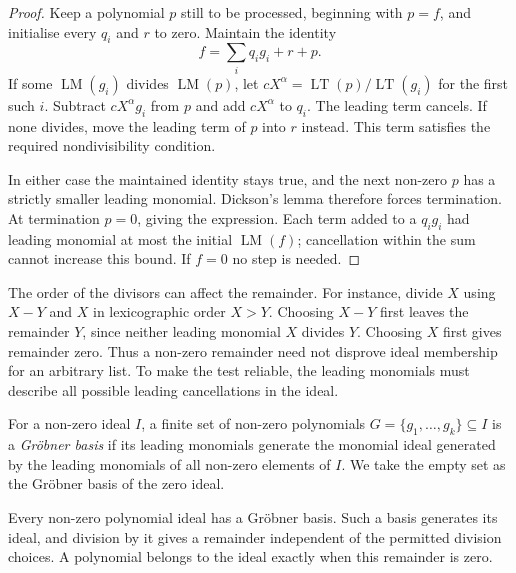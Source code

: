\begin{proof}
Keep a polynomial $p$ still to be processed, beginning with $p=f$, and initialise every $q_i$ and $r$ to zero. Maintain the identity
\[
f=\sum_iq_ig_i+r+p.
\]
If some $\operatorname{LM}(g_i)$ divides $\operatorname{LM}(p)$, let $cX^\alpha=\operatorname{LT}(p)/\operatorname{LT}(g_i)$ for the first such $i$. Subtract $cX^\alpha g_i$ from $p$ and add $cX^\alpha$ to $q_i$. The leading term cancels. If none divides, move the leading term of $p$ into $r$ instead. This term satisfies the required nondivisibility condition.

In either case the maintained identity stays true, and the next non-zero $p$ has a strictly smaller leading monomial. Dickson's lemma therefore forces termination. At termination $p=0$, giving the expression. Each term added to a $q_i g_i$ had leading monomial at most the initial $\operatorname{LM}(f)$; cancellation within the sum cannot increase this bound. If $f=0$ no step is needed.
\end{proof}

The order of the divisors can affect the remainder. For instance, divide $X$ using $X-Y$ and $X$ in lexicographic order $X>Y$. Choosing $X-Y$ first leaves the remainder $Y$, since neither leading monomial $X$ divides $Y$. Choosing $X$ first gives remainder zero. Thus a non-zero remainder need not disprove ideal membership for an arbitrary list. To make the test reliable, the leading monomials must describe all possible leading cancellations in the ideal.

\begin{definition}\label{def:groebner}
For a non-zero ideal $I$, a finite set of non-zero polynomials $G=\{g_1,\ldots,g_k\}\subseteq I$ is a \emph{Gröbner basis} if its leading monomials generate the monomial ideal generated by the leading monomials of all non-zero elements of $I$. We take the empty set as the Gröbner basis of the zero ideal.
\end{definition}

\begin{proposition}\label{prop:groebnerprops}
Every non-zero polynomial ideal has a Gröbner basis. Such a basis generates its ideal, and division by it gives a remainder independent of the permitted division choices. A polynomial belongs to the ideal exactly when this remainder is zero.
\end{proposition}

